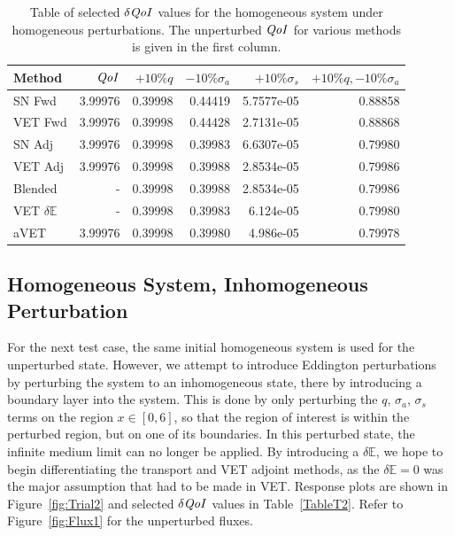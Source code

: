 \documentclass[12pt]{report}
\newcommand{\Edd}{\mathbb{E}}
\newcommand{\sigs}{\sigma_s}
\newcommand{\siga}{\sigma_a}
\newcommand{\qoi}{{\it QoI}\xspace}
\begin{document}
\begin{table}[H]
\centering
  \begin{tabular}{| l | r || r | r | r | r |}
    \hline
    Method  & $\qoi$ & $+10\% q $  & $-10\% \siga $ & $+10\% \sigs $ & $+10\% q,-10\% \siga$ \\ \hline
     SN Fwd 			&3.99976	&0.39998 &0.44419 &5.7577e-05 & 0.88858\\ \hline
     VET Fwd			&3.99976	&0.39998 &0.44428 &2.7131e-05 &0.88868\\ \hline
     SN Adj			    &3.99976	&0.39998 &0.39983 &6.6307e-05 &0.79980\\ \hline
     VET Adj 			&3.99976	&0.39998 &0.39988 &2.8534e-05 &0.79986\\ \hline
     Blended 			&-			&0.39998 &0.39988 &2.8534e-05 &0.79986\\ \hline
     VET $\delta \Edd$ 	&-			&0.39998 &0.39983 &6.124e-05 &0.79980\\ \hline
     aVET				&3.99976 	&0.39998 &0.39980 &4.986e-05	 &0.79978\\ \hline
    \end{tabular}
  \caption{Table of selected $\delta \qoi$ values for the homogeneous system under homogeneous perturbations. The unperturbed $\qoi$ for various methods is given in the first column.}
  \label{TableT1}
\end{table}


\subsection{Homogeneous System, Inhomogeneous Perturbation}

For the next test case, the same initial homogeneous system is used for the unperturbed state. However, we attempt to introduce Eddington perturbations by perturbing the system to an inhomogeneous state, there by introducing a boundary layer into the system. This is done by only perturbing the $q$, $\siga$, $\sigs$ terms on the region $x \in [0,6]$, so that the region of interest is within the perturbed region, but on one of its boundaries. In this perturbed state, the infinite medium limit can no longer be applied. By introducing a $\delta \Edd$, we hope to begin differentiating the transport and VET adjoint methods, as the $\delta \Edd=0$ was the major assumption that had to be made in VET. Response plots are shown in Figure~\ref{fig:Trial2} and selected $\delta \qoi$ values in Table~\ref{TableT2}. Refer to Figure~\ref{fig:Flux1} for the unperturbed fluxes.
\end{document}
